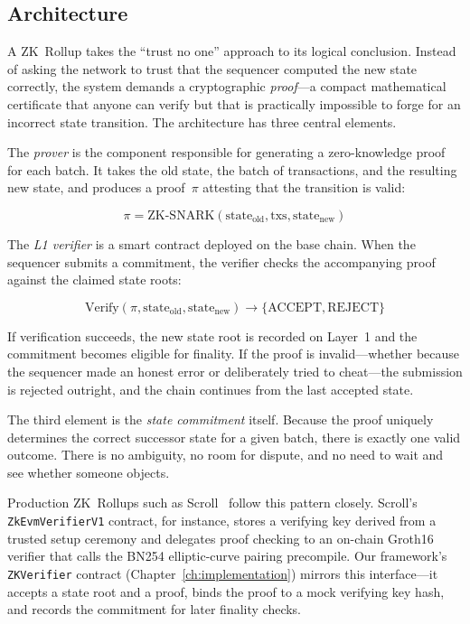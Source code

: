 \documentclass[
]{elteikthesis}[2024/04/26]
\begin{document}
\subsection{Architecture}

A ZK~Rollup takes the ``trust no one'' approach to its logical conclusion. Instead of asking the network to trust that the sequencer computed the new state correctly, the system demands a cryptographic \textit{proof}---a compact mathematical certificate that anyone can verify but that is practically impossible to forge for an incorrect state transition. The architecture has three central elements.

The \textit{prover} is the component responsible for generating a zero-knowledge proof for each batch. It takes the old state, the batch of transactions, and the resulting new state, and produces a proof~$\pi$ attesting that the transition is valid:

\begin{equation}
\pi = \text{ZK-SNARK}(\text{state}_{\text{old}}, \text{txs}, \text{state}_{\text{new}})
\end{equation}

The \textit{L1 verifier} is a smart contract deployed on the base chain. When the sequencer submits a commitment, the verifier checks the accompanying proof against the claimed state roots:

\begin{equation}
\text{Verify}(\pi, \text{state}_{\text{old}}, \text{state}_{\text{new}}) \rightarrow \{\text{ACCEPT}, \text{REJECT}\}
\end{equation}

\noindent If verification succeeds, the new state root is recorded on Layer~1 and the commitment becomes eligible for finality. If the proof is invalid---whether because the sequencer made an honest error or deliberately tried to cheat---the submission is rejected outright, and the chain continues from the last accepted state.

The third element is the \textit{state commitment} itself. Because the proof uniquely determines the correct successor state for a given batch, there is exactly one valid outcome. There is no ambiguity, no room for dispute, and no need to wait and see whether someone objects.

Production ZK~Rollups such as Scroll~\cite{zksync-paper} follow this pattern closely. Scroll's \texttt{ZkEvmVerifierV1} contract, for instance, stores a verifying key derived from a trusted setup ceremony and delegates proof checking to an on-chain Groth16 verifier that calls the BN254 elliptic-curve pairing precompile. Our framework's \texttt{ZKVerifier} contract (Chapter~\ref{ch:implementation}) mirrors this interface---it accepts a state root and a proof, binds the proof to a mock verifying key hash, and records the commitment for later finality checks.
\end{document}
